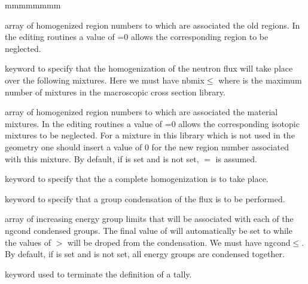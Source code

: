 \begin{ListeDeDescription}{mmmmmmmm}
\item[\dusa{iregm}] array of homogenized region numbers to which are
associated the old regions. In the editing routines a value of =0
allows the corresponding region to be neglected. 

\item[\moc{MIX}] keyword to specify that the homogenization of the neutron
flux will take place over the following mixtures. Here
we must have nbmix$\le$ where  is the maximum number
of mixtures in the macroscopic cross section library.  

\item[\dusa{imixm}] array of homogenized region numbers to which are
associated the material mixtures. In the editing routines a value of
=0 allows the corresponding isotopic mixtures to be neglected. For a mixture in this
library which is not used in the geometry one should insert a value of 0 for the
new region number associated with this mixture. By default, if  is set and
 is not set, $=$ is assumed.

\item[\moc{COMP}] keyword to specify that the a complete homogenization is to
take place.

\item[\moc{COND}] keyword to specify that a group condensation of the flux is
to be performed.

\item[\dusa{icond}] array of increasing energy group limits that will be associated with
each of the ngcond condensed groups. The final value of
 will automatically be set to  while the values of 
$>$ will be droped from the condensation. 
We must have ngcond$\le$. By default, if  is set and 
is not set, all energy groups are condensed together.

\item[\moc{ENDT}] keyword used to terminate the definition of a tally.

\end{ListeDeDescription}

\eject
